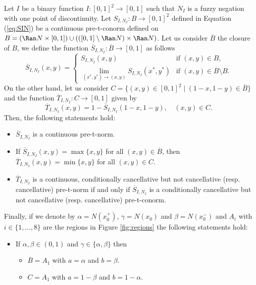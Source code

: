\begin{corollary}\label{cor:fromSINtoTIN}
	Let $I$ be a binary function $I:[0,1]^2 \to [0,1]$ such that $N_I$ is a fuzzy negation with one point of discontinuity. Let $S_{I,N_I}: B \to [0,1]^2$ defined in Equation (\ref{eq:SIN}) be a continuous pre-t-conorm defined on $B=(\Ran N \times [0,1]) \cup (([0,1] \setminus \Ran N) \times \Ran N)$. Let us consider $\overline{B}$ the closure of $B$, we define the function $\overline{S}_{I,N_I}: \overline{B} \to [0,1]$ as follows
	$$
	\overline{S}_{I,N_I}(x,y) =
	\left\{ \begin{array}{ll}
		S_{I,N_I}(x,y) &   \text{if }   (x,y) \in B, \\
		\displaystyle \lim_{(x^*,y^*) \to (x,y)} S_{I,N_I}(x^*,y^*) &   \text{if }   (x,y) \in \overline{B} \setminus B.
	\end{array} \right.
	$$
	On the other hand, let us consider $C=\{(x,y) \in [0,1]^2 \mid (1-x,1-y) \in \overline{B} \}$ and the function $\overline{T}_{I,N_I}: C \to [0,1]$ given by
	\begin{equation}\label{eq:fromSINtoTIN}
		\overline{T}_{I,N_I}(x,y) = 1- \overline{S}_{I,N_I}(1-x,1-y), \quad (x,y) \in C.
	\end{equation}
	Then, the following statements hold:
	\begin{itemize}
		\item $\overline{S}_{I,N_I}$ is a continuous pre-t-norm.
		\item If $\overline{S}_{I,N_I}(x,y)= \max\{x,y\}$ for all $(x,y) \in \overline{B}$, then $\overline{T}_{I,N_I}(x,y)=\min\{x,y\}$ for all $(x,y) \in C$.
		\item $\overline{T}_{I,N_I}$ is a continuous, conditionally cancellative but not cancellative (resp. cancellative) pre-t-norm if and only if $\overline{S}_{I,N_I}$ is a conditionally cancellative but not cancellative (resp. cancellative) pre-t-conorm.
	\end{itemize}
	Finally, if we denote by $\alpha=N(x_0^{+})$, $\gamma=N(x_0)$ and $\beta=N(x_0^{-})$ and $A_i$ with $i \in \{1,\dots,8\}$ are the regions in Figure \ref{fig:regions} the following statements hold:
	\begin{itemize}
		\item If $\alpha, \beta \in (0,1)$ and $\gamma \in \{\alpha, \beta\}$ then 
		\begin{itemize}
			\item $\overline{B} = A_1$ with $a=\alpha$ and $b=\beta$.
			\item $C = A_1$ with $a=1-\beta$ and $b=1-\alpha$.

\end{itemize}
\end{itemize}
\end{corollary}
